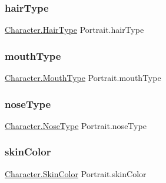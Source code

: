 \mbox{\label{class_portrait_a7fbaf07b4f6d0fe0213e4b812fe90acc}} 
\subsubsection{\texorpdfstring{hairType}{hairType}}
{\footnotesize\ttfamily \mbox{\hyperlink{class_character_ada39ccb0e0be37a8f8f0e9a864eb5733}{Character.\+Hair\+Type}} Portrait.\+hair\+Type\hspace{0.3cm}{\ttfamily [get]}}

\mbox{\label{class_portrait_a9ce977a3c3a8b9790abfaeb57dd16d78}} 
\subsubsection{\texorpdfstring{mouthType}{mouthType}}
{\footnotesize\ttfamily \mbox{\hyperlink{class_character_aaefb65409260b3ad1511951aab1ddd6c}{Character.\+Mouth\+Type}} Portrait.\+mouth\+Type\hspace{0.3cm}{\ttfamily [get]}}

\mbox{\label{class_portrait_a08a64694ad71d1f822acbf63845ae130}} 
\subsubsection{\texorpdfstring{noseType}{noseType}}
{\footnotesize\ttfamily \mbox{\hyperlink{class_character_a638a71f8525dc3a59596f7f4a7836036}{Character.\+Nose\+Type}} Portrait.\+nose\+Type\hspace{0.3cm}{\ttfamily [get]}}

\mbox{\label{class_portrait_ac3ed63c9b306564506b4b96867990f84}} 
\subsubsection{\texorpdfstring{skinColor}{skinColor}}
{\footnotesize\ttfamily \mbox{\hyperlink{class_character_a726214a0fe480fffada7772697764824}{Character.\+Skin\+Color}} Portrait.\+skin\+Color\hspace{0.3cm}{\ttfamily [get]}}

